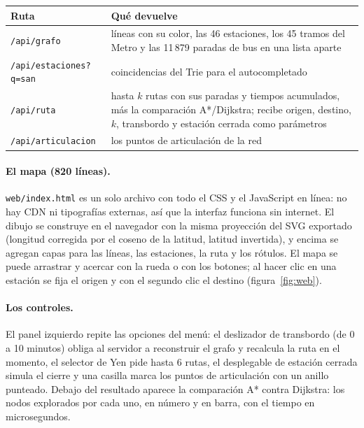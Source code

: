 \documentclass[11pt,a4paper]{article}
\newcommand{\arch}[1]{\texttt{#1}}
\begin{document}
\begin{center}
\footnotesize
\begin{tabular}{@{}p{4.7cm}p{9.8cm}@{}}
\toprule
Ruta & Qué devuelve \\
\midrule
\arch{/api/grafo} & líneas con su color, las 46 estaciones, los 45 tramos del Metro y las 11\,879 paradas de bus en una lista aparte \\
\arch{/api/estaciones?q=san} & coincidencias del Trie para el autocompletado \\
\arch{/api/ruta} & hasta $k$ rutas con sus paradas y tiempos acumulados, más la comparación A*/Dijkstra; recibe origen, destino, $k$, transbordo y estación cerrada como parámetros \\
\arch{/api/articulacion} & los puntos de articulación de la red \\
\bottomrule
\end{tabular}
\end{center}

\paragraph{El mapa (820 líneas).}
\arch{web/index.html} es un solo archivo con todo el CSS y el JavaScript en
línea: no hay CDN ni tipografías externas, así que la interfaz funciona sin
internet. El dibujo se construye en el navegador con la misma proyección del
SVG exportado (longitud corregida por el coseno de la latitud, latitud
invertida), y encima se agregan capas para las líneas, las estaciones, la ruta y
los rótulos. El mapa se puede arrastrar y acercar con la rueda o con los botones;
al hacer clic en una estación se fija el origen y con el segundo clic el destino
(figura~\ref{fig:web}).

\paragraph{Los controles.}
El panel izquierdo repite las opciones del menú: el deslizador de transbordo
(de 0 a 10 minutos) obliga al servidor a reconstruir el grafo y recalcula la
ruta en el momento, el selector de Yen pide hasta 6 rutas, el desplegable de
estación cerrada simula el cierre y una casilla marca los puntos de articulación
con un anillo punteado. Debajo del resultado aparece la comparación A* contra
Dijkstra: los nodos explorados por cada uno, en número y en barra, con el tiempo
en microsegundos.
\end{document}
